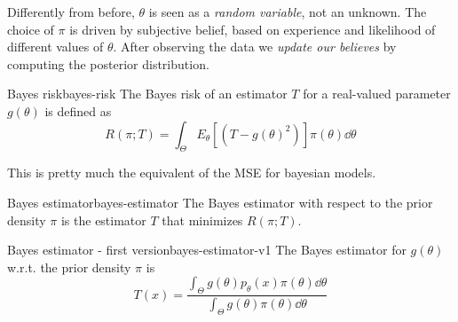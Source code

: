 \documentclass[12pt]{extarticle}
\begin{document}
Differently from before, $\theta$ is seen as a \emph{random variable}, not an unknown.
The choice of $\pi$ is driven by subjective belief, based on experience and likelihood of different values of $\theta$.
After observing the data we \emph{update our believes} by computing the posterior distribution.

\begin{definition}{Bayes risk}{bayes-risk}
    The Bayes risk of an estimator $T$ for a real-valued parameter $g(\theta)$ is defined as
    \begin{equation}
        R(\pi; T) = \int_\Theta E_\theta[(T-g(\theta)^2)] \pi(\theta) \dd{\theta}
    \end{equation}
\end{definition}
This is pretty much the equivalent of the MSE for bayesian models.

\begin{definition}{Bayes estimator}{bayes-estimator}
    The Bayes estimator with respect to the prior density $\pi$ is the estimator $T$ that minimizes $R(\pi; T)$.
\end{definition}

\begin{theorem}{Bayes estimator - first version}{bayes-estimator-v1}
    The Bayes estimator for $g(\theta)$ w.r.t. the prior density $\pi$ is
    \begin{equation}
        T(x) = \frac{\int_\Theta g(\theta) p_\theta(x)\pi(\theta) \dd{\theta}}{\int_\Theta g(\theta) \pi(\theta) \dd{\theta}}
    \end{equation}
\end{theorem}
\end{document}
